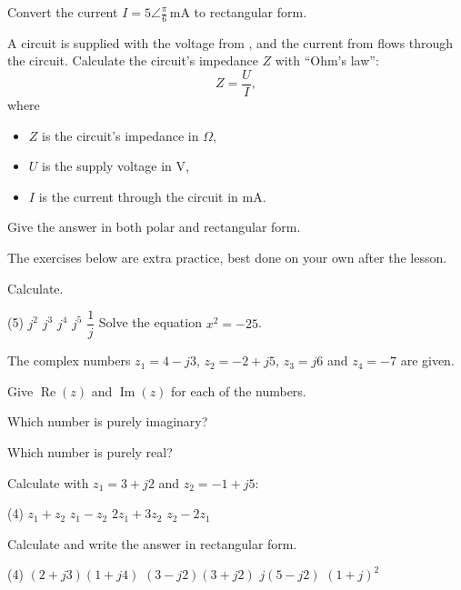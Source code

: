Convert the current $I = 5\angle\frac{\pi}{6}\,\text{mA}$ to rectangular form.

A circuit is supplied with the voltage from , and the current from  flows
through the circuit. Calculate the circuit's impedance $Z$ with “Ohm's law”:
\[
  Z = \frac{U}{I},
\]
where
\begin{itemize}
  \item $Z$ is the circuit's impedance in $\Omega$,
  \item $U$ is the supply voltage in V,
  \item $I$ is the current through the circuit in mA.
\end{itemize}
Give the answer in both polar and rectangular form.

The exercises below are extra practice, best done on your own after the lesson.

Calculate.
\begin{delar}(5)
  \task $j^2$
  \task $j^3$
  \task $j^4$
  \task $j^5$
  \task $\dfrac{1}{j}$
  \task* Solve the equation $x^2 = -25$.
\end{delar}

The complex numbers $z_1 = 4 - j3$, $z_2 = -2 + j5$, $z_3 = j6$ and $z_4 = -7$ are given.
\begin{parts}
  \item Give $\operatorname{Re}(z)$ and $\operatorname{Im}(z)$ for each of the numbers.
  \item Which number is purely imaginary?
  \item Which number is purely real?
\end{parts}

Calculate with $z_1 = 3 + j2$ and $z_2 = -1 + j5$:
\begin{delar}(4)
  \task $z_1 + z_2$
  \task $z_1 - z_2$
  \task $2z_1 + 3z_2$
  \task $z_2 - 2z_1$
\end{delar}

Calculate and write the answer in rectangular form.
\begin{delar}(4)
  \task $(2 + j3)(1 + j4)$
  \task $(3 - j2)(3 + j2)$
  \task $j(5 - j2)$
  \task $(1 + j)^2$
\end{delar}

